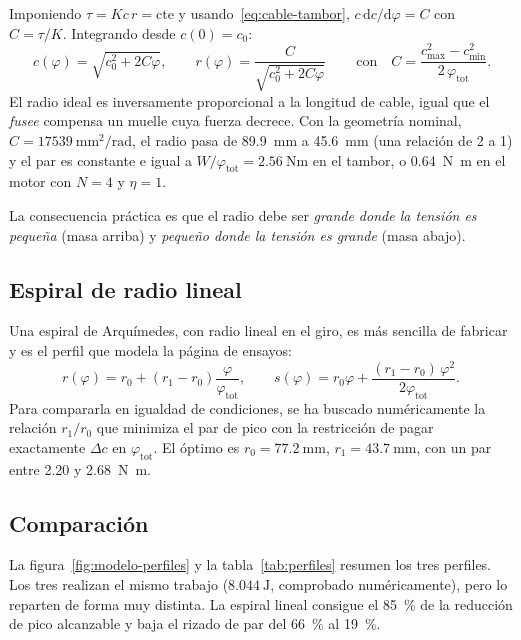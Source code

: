 Imponiendo $\tau = K c\,r = \text{cte}$ y usando~\eqref{eq:cable-tambor}, $c\,\mathrm{d}c/\mathrm{d}\varphi = C$
con $C=\tau/K$. Integrando desde $c(0)=c_0$:
\begin{equation}
  \boxed{\,c(\varphi) = \sqrt{c_0^2 + 2C\varphi}, \qquad r(\varphi) = \frac{C}{\sqrt{c_0^2 + 2C\varphi}}\,}
  \qquad\text{con}\quad C = \frac{c_{\max}^2 - c_{\min}^2}{2\,\varphi_{\text{tot}}}.
  \label{eq:ideal}
\end{equation}
El radio ideal es inversamente proporcional a la longitud de cable, igual que el \emph{fusee}
compensa un muelle cuya fuerza decrece. Con la geometría nominal, $C = \SI{17539}{\milli\metre\squared\per\radian}$,
el radio pasa de \SI{89.9}{\milli\metre} a \SI{45.6}{\milli\metre} (una relación de 2 a 1) y el par
es constante e igual a $W/\varphi_{\text{tot}} = \SI{2.56}{\newton\metre}$ en el tambor, o
\SI{0.64}{\newton\metre} en el motor con $N=4$ y $\eta=1$.

La consecuencia práctica es que el radio debe ser \emph{grande donde la tensión es pequeña} (masa
arriba) y \emph{pequeño donde la tensión es grande} (masa abajo).

\subsection{Espiral de radio lineal}

Una espiral de Arquímedes, con radio lineal en el giro, es más sencilla de fabricar y es el perfil
que modela la página de ensayos:
\begin{equation}
  r(\varphi) = r_0 + (r_1-r_0)\frac{\varphi}{\varphi_{\text{tot}}}, \qquad
  s(\varphi) = r_0\varphi + \frac{(r_1-r_0)\,\varphi^2}{2\varphi_{\text{tot}}}.
  \label{eq:espiral}
\end{equation}
Para compararla en igualdad de condiciones, se ha buscado numéricamente la relación $r_1/r_0$ que
minimiza el par de pico con la restricción de pagar exactamente $\Delta c$ en $\varphi_{\text{tot}}$.
El óptimo es $r_0 = \SI{77.2}{\milli\metre}$, $r_1 = \SI{43.7}{\milli\metre}$, con un par entre
\num{2.20} y \SI{2.68}{\newton\metre}.

\subsection{Comparación}

La figura~\ref{fig:modelo-perfiles} y la tabla~\ref{tab:perfiles} resumen los tres perfiles. Los
tres realizan el mismo trabajo ($\SI{8.044}{\joule}$, comprobado numéricamente), pero lo reparten
de forma muy distinta. La espiral lineal consigue el \SI{85}{\percent} de la reducción de pico
alcanzable y baja el rizado de par del \SI{66}{\percent} al \SI{19}{\percent}.

